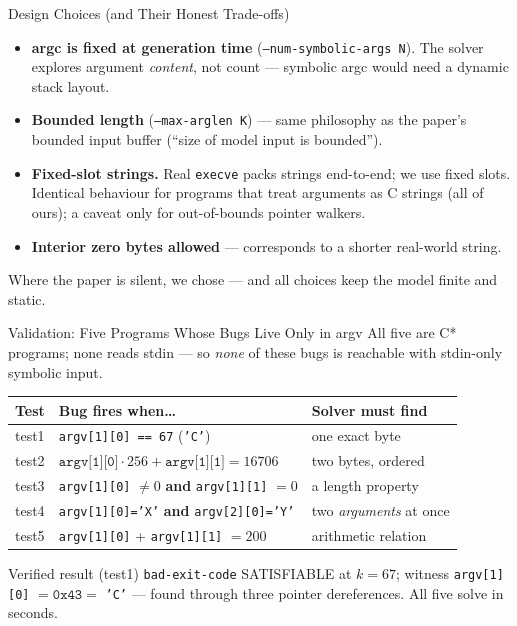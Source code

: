 \documentclass[aspectratio=169]{beamer}
\newcommand{\keylab}[1]{\textbf{\color{blue!55!black}#1}}
\newcommand{\flag}[1]{\texttt{\small #1}}
\begin{document}
\begin{frame}{Design Choices (and Their Honest Trade-offs)}
  \begin{itemize}\setlength\itemsep{0.35em}
    \item \keylab{argc is fixed at generation time}
          (\flag{--num-symbolic-args~N}). The solver explores argument
          \emph{content}, not count --- symbolic argc would need a
          dynamic stack layout.
    \item \keylab{Bounded length} (\flag{--max-arglen~K}) --- same
          philosophy as the paper's bounded input buffer
          (``size of model input is bounded'').
    \item \keylab{Fixed-slot strings.} Real \texttt{execve} packs
          strings end-to-end; we use fixed slots. Identical behaviour
          for programs that treat arguments as C strings (all of ours);
          a caveat only for out-of-bounds pointer walkers.
    \item \keylab{Interior zero bytes allowed} --- corresponds to a
          shorter real-world string.
  \end{itemize}
  {\footnotesize Where the paper is silent, we chose --- and all
  choices keep the model finite and static.}
\end{frame}

\begin{frame}{Validation: Five Programs Whose Bugs Live Only in argv}
  All five are C* programs; none reads stdin --- so \emph{none} of
  these bugs is reachable with stdin-only symbolic input.
  \vspace{0.15cm}
  \begin{center}
  \footnotesize
  \begin{tabular}{lll}
    \toprule
    Test & Bug fires when\dots & Solver must find\\
    \midrule
    test1 & \texttt{argv[1][0] == 67} (\texttt{'C'}) & one exact byte\\
    test2 & $\texttt{argv[1][0]}{\cdot}256 + \texttt{argv[1][1]} = 16706$
          & two bytes, ordered\\
    test3 & \texttt{argv[1][0]} $\neq 0$ \textbf{and}
            \texttt{argv[1][1]} $= 0$ & a length property\\
    test4 & \texttt{argv[1][0]='X'} \textbf{and}
            \texttt{argv[2][0]='Y'} & two \emph{arguments} at once\\
    test5 & \texttt{argv[1][0]} + \texttt{argv[1][1]} $= 200$
          & arithmetic relation\\
    \bottomrule
  \end{tabular}
  \end{center}
  \vspace{0.2cm}
  \begin{block}{Verified result (test1)}
    \texttt{bad-exit-code} SATISFIABLE at $k = 67$; witness
    \texttt{argv[1][0]} $= \texttt{0x43} = $ \texttt{'C'} --- found
    through three pointer dereferences. All five solve in seconds.
  \end{block}
\end{frame}
\end{document}
